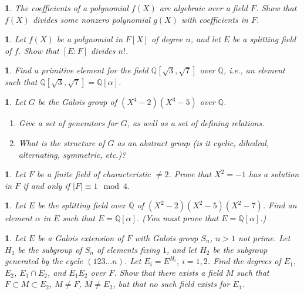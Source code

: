 \documentclass[a4paper,11pt,final,openany]{memoir}
\newtheorem{exercise}[Y]{}
\theoremstyle{nonumberplain}
\begin{document}
\begin{exercise}
\label{x35} The coefficients of a polynomial $f(X)$ are algebraic over a field
$F$. Show that $f(X)$ divides some nonzero polynomial $g(X)$ with coefficients
in $F$.
\end{exercise}

\begin{exercise}
\label{x36} Let $f(X)$ be a polynomial in $F[X]$ of degree $n$, and let $E$ be
a splitting field of $f$. Show that $[E\colon F]$ divides $n!$.
\end{exercise}

\begin{exercise}
\label{x37} Find a primitive element for the field ${\mathbb{Q}}[\sqrt
3,\sqrt7]$ over ${\mathbb{Q}}$, i.e., an element such that ${\mathbb{Q}}%
[\sqrt3,\sqrt7]={\mathbb{Q}}[\alpha]$.
\end{exercise}

\begin{exercise}
\label{x38} Let $G$ be the Galois group of $(X^{4}-2)(X^{3}-5)$ over
${\mathbb{Q}}$.

\begin{enumerate}
\item Give a set of generators for $G$, as well as a set of defining relations.

\item What is the structure of $G$ as an abstract group (is it cyclic,
dihedral, alternating, symmetric, etc.)?
\end{enumerate}
\end{exercise}

\begin{exercise}
\label{x39} Let $F$ be a finite field of characteristic $\neq2$. Prove that
$X^{2}=-1$ has a solution in $F$ if and only if $\left\vert F\right\vert
\equiv1\mod4$.
\end{exercise}

\begin{exercise}
\label{x40} Let $E$ be the splitting field over ${\mathbb{Q}}$ of
$(X^{2}-2)(X^{2}-5)(X^{2}-7)$. Find an element $\alpha$ in $E$ such that
$E={\mathbb{Q}}[\alpha]$. (You must prove that $E={\mathbb{Q}}[\alpha]$.)
\end{exercise}

\begin{exercise}
\label{x41} Let $E$ be a Galois extension of $F$ with Galois group $S_{n}$,
$n>1$ not prime. Let $H_{1}$ be the subgroup of $S_{n}$ of elements fixing
$1$, and let $H_{2}$ be the subgroup generated by the cycle $(123\ldots n)$.
Let $E_{i}=E^{H_{i}}$, $i=1, 2$. Find the degrees of $E_{1}$, $E_{2}$,
$E_{1}\cap E_{2}$, and $E_{1}E_{2}$ over $F$. Show that there exists a field
$M$ such that $F\subset M\subset E_{2}$, $M\neq F$, $M\neq E_{2}$, but that no
such field exists for $E_{1}$.
\end{exercise}
\end{document}
